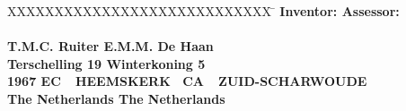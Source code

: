 \begin{tabbing}
XXXXXXXXXXXXXXXXXXXXXXXXXXXX \= \kill
\bfseries Inventor: \> \bfseries Assessor: \\
\\
T.M.C. Ruiter \> E.M.M. De Haan\\
Terschelling 19 \> Winterkoning 5\\
1967 EC\ \ HEEMSKERK \ CA\ \ ZUID-SCHARWOUDE\\
The Netherlands \> The Netherlands\\
\end{tabbing}
